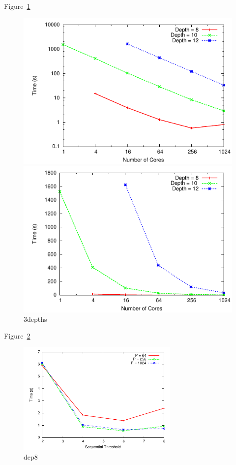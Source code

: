 \documentclass[11pt]{article}
\begin{document}
Figure~\ref{3depths}
\begin{figure}
\begin{minipage}{0.5\linewidth}
\centering
\includegraphics[width=\textwidth]{plots/3depths.pdf}
\end{minipage}
\begin{minipage}{0.5\linewidth}
\centering
\includegraphics[width=\textwidth]{plots/3depthsnolog.pdf}
\end{minipage}
\caption{3depths}
\label{3depths}
\end{figure}
 
Figure~\ref{dep8}
\begin{figure}
\centering
\includegraphics[width=0.7\textwidth]{plots/dep8.pdf}
\caption{dep8}
\label{dep8}
\end{figure}
 
\end{document}
